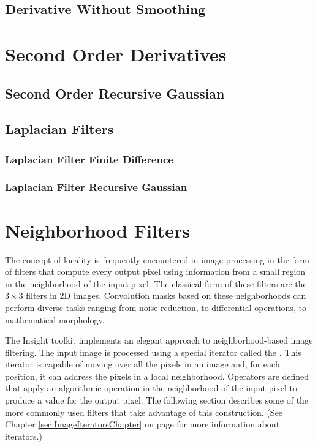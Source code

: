 \subsection{Derivative Without Smoothing}
\label{sec:DerivativeImageFilter}

\ifitkFullVersion

\fi


\section{Second Order Derivatives}
\label{sec:SecondOrderDerivatives}


\subsection{Second Order Recursive Gaussian}

\ifitkFullVersion

\fi


\subsection{Laplacian Filters}
\label{sec:LaplacianFilters}

\subsubsection{Laplacian Filter Finite Difference}
\subsubsection{Laplacian Filter Recursive Gaussian}

\section{Neighborhood Filters}
\label{sec:NeighborhoodFilters}

The concept of locality is frequently encountered in image processing in the
form of filters that compute every output pixel using information from a small
region in the neighborhood of the input pixel.  The classical form of
these filters are the $3 \times 3$ filters in 2D images. Convolution masks
based on these neighborhoods can perform diverse tasks ranging from noise
reduction, to differential operations, to mathematical morphology.

The Insight toolkit implements an elegant approach to neighborhood-based image
filtering.  The input image is processed using a special iterator called the
. This iterator is capable of moving over all the
pixels in an image and, for each position, it can address the pixels in a local
neighborhood. Operators are defined that apply an algorithmic operation in the
neighborhood of the input pixel to produce a value for the output pixel.  The
following section describes some of the more commonly used filters that take
advantage of this construction. (See Chapter
\ref{sec:ImageIteratorsChapter} on page
\pageref{sec:ImageIteratorsChapter} for more information about iterators.)

